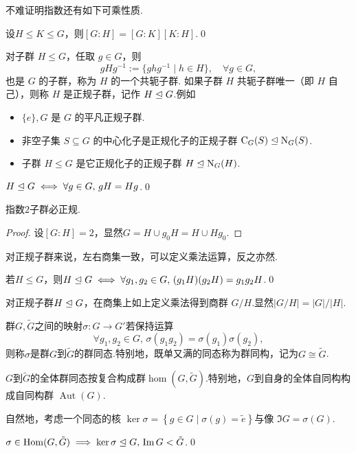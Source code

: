 不难证明指数还有如下可乘性质.
\begin{prop}
	设$H\le K\le G$，则$[G:H]=[G:K][K:H]$.\qed
\end{prop}

对子群 $H\le G$，任取 $g\in G$，则
\[
	gHg^{-1}:=\{ghg^{-1}\mid h\in H\},\quad\forall g\in G,
\]
也是 $G$ 的子群，称为 $H$ 的一个{\heiti 共轭子群}.
如果子群 $H$ 共轭子群唯一（即 $H$ 自己），则称 $H$ 是{\heiti 正规子群}，记作 $H\trianglelefteq G$.例如
\begin{itemize}
	\item $\{e\},G$ 是 $G$ 的平凡正规子群.
	\item 非空子集 $S\subseteq G$ 的中心化子是正规化子的正规子群 $\mathrm{C}_G(S)\trianglelefteq\mathrm{N}_G(S)$.
	\item 子群 $H\le G$ 是它正规化子的正规子群 $H\trianglelefteq\mathrm{N}_G(H)$.
\end{itemize}
\begin{lemma}
	$H\trianglelefteq G\iff\forall g\in G,\,gH=Hg$.\qed
\end{lemma}
\begin{cor}
	指数$2$子群必正规.
\end{cor}
\begin{proof}
	设$[G:H]=2$，显然$G=H\cup g_0H=H\cup Hg_0$.
\end{proof}

对正规子群来说，左右商集一致，可以定义乘法运算，反之亦然.
\begin{lemma}
	若$H\le G$，则$H\trianglelefteq G\iff\forall g_1,g_2\in G,\,(g_1H)(g_2H)=g_1g_2H$.\qed
\end{lemma}

对正规子群$H\trianglelefteq G$，在商集上如上定义乘法得到{\heiti 商群} $G/H$.显然$|G/H|=|G|/|H|$.

\begin{definition}
	群$G,\tilde{G}$之间的映射$\sigma\colon G\to G'$若保持运算
	\[
		\forall g_1,g_2\in G,\,\sigma(g_1g_2)=\sigma(g_1)\sigma(g_2),
	\]
	则称$\sigma$是群$G$到$\tilde{G}$的{\heiti 群同态}.特别地，既单又满的同态称为{\heiti 群同构}，记为$G\cong\tilde{G}$.

	$G$到$\tilde{G}$的全体群同态按复合构成群$\hom(G,\tilde{G})$.特别地，$G$到自身的全体自同构构成{\heiti 自同构群} $\operatorname*{Aut}(G)$.
\end{definition}

自然地，考虑一个同态的{\heiti 核} $\ker\sigma=\left\{g\in G\mid \sigma(g)=\tilde{e}\right\}$与{\heiti 像} $\Im G=\sigma(G)$.
\begin{prop}
	$\sigma\in\operatorname*{Hom}(G,\tilde{G})\implies\ker\sigma\trianglelefteq G,\,\operatorname*{Im} G<\tilde{G}$.\qed
\end{prop}


